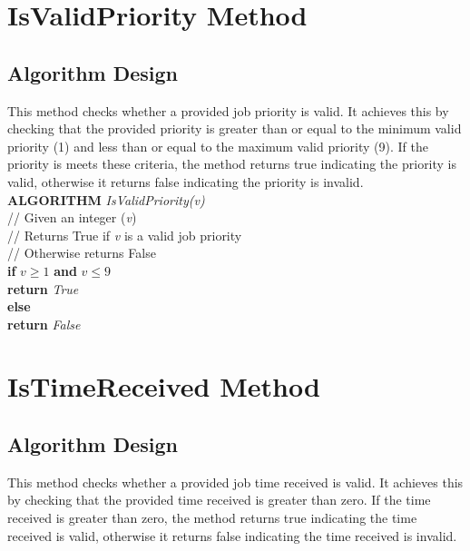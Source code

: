 \documentclass[12pt,a4paper]{article}
\begin{document}
	\newpage

	\section{IsValidPriority Method}
		\subsection{Algorithm Design}
			This method checks whether a provided job priority is valid. It achieves this by 
			checking that the provided priority is greater than or equal to the minimum valid priority (1) and 
			less than or equal to the maximum valid priority (9). If the priority is meets these criteria, the 
			method returns true indicating the priority is valid, otherwise it returns false 
			indicating the priority is invalid.\\

			\textbf{ALGORITHM} \textit{IsValidPriority(v)}\\
			\null\hspace{1cm}// Given an integer (\textit{v})\\
			\null\hspace{1cm}// Returns True if \textit{v} is a valid job priority\\
			\null\hspace{1cm}// Otherwise returns False\\
			\null\hspace{1cm}\textbf{if} \textit{$v \geq 1$} \textbf{and} \textit{$v \leq 9$}\\
			\null\hspace{2cm}\textbf{return} \textit{True}\\
			\null\hspace{1cm}\textbf{else}\\
			\null\hspace{2cm}\textbf{return} \textit{False}\\
			
	\section{IsTimeReceived Method}
		\subsection{Algorithm Design}
			This method checks whether a provided job time received is valid. It achieves this by
			checking that the provided time received is greater than zero. If the time received is
			greater than zero, the method returns true indicating the time received is valid, otherwise
			it returns false indicating the time received is invalid.\\
\end{document}
